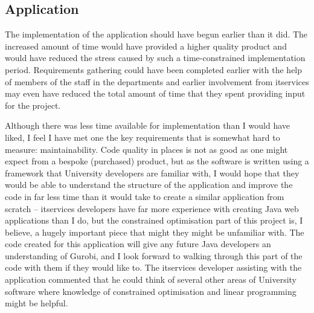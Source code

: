 \subsection{Application}

The implementation of the application should have begun earlier than it did.
The increased amount of time would have provided a higher quality product and
would have reduced the stress caused by such a time-constrained implementation
period. Requirements gathering could have been completed earlier with the help
of members of the staff in the departments and earlier involvement from
\gls{itservices} may even have reduced the total amount of time that they
spent providing input for the project.

Although there was less time available for implementation than I would have
liked, I feel I have met one the key requirements that is somewhat hard to
measure: maintainability. Code quality in places is not as good as one might
expect from a bespoke (purchased) product, but as the software is written
using a framework that University developers are familiar with, I would hope
that they would be able to understand the structure of the application and
improve the code in far less time than it would take to create a similar
application from scratch -- \gls{itservices} developers have far more
experience with creating Java web applications than I do, but the constrained
optimisation part of this project is, I believe, a hugely important piece that
might they might be unfamiliar with. The code created for this application
will give any future Java developers an understanding of Gurobi, and I look
forward to walking through this part of the code with them if they would like
to. The \gls{itservices} developer assisting with the application commented
that he could think of several other areas of University software where
knowledge of constrained optimisation and linear programming might be helpful.

